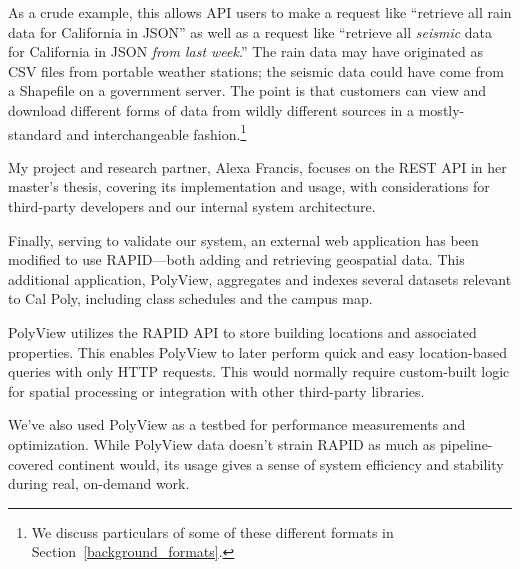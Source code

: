 As a crude example, this allows API users to make a request like ``retrieve all rain data for California in JSON'' as well as a request like ``retrieve all \textit{seismic} data for California in JSON \textit{from last week}.'' The rain data may have originated as CSV files from portable weather stations; the seismic data could have come from a Shapefile on a government server. The point is that customers can view and download different forms of data from wildly different sources in a mostly-standard and interchangeable fashion.\footnote{We discuss particulars of some of these different formats in Section~\ref{background_formats}.}

My project and research partner, Alexa Francis, focuses on the REST API in her master's thesis, covering its implementation and usage, with considerations for third-party developers and our internal system architecture.

\label{polyview_intro}
Finally, serving to validate our system, an external web application has been modified to use RAPID---both adding and retrieving geospatial data. This additional application, PolyView, aggregates and indexes several datasets relevant to Cal Poly, including class schedules and the campus map.

PolyView utilizes the RAPID API to store building locations and associated properties. This enables PolyView to later perform quick and easy location-based queries with only HTTP requests. This would normally require custom-built logic for spatial processing or integration with other third-party libraries.

We've also used PolyView as a testbed for performance measurements and optimization. While PolyView data doesn't strain RAPID as much as pipeline-covered continent would, its usage gives a sense of system efficiency and stability during real, on-demand work.

